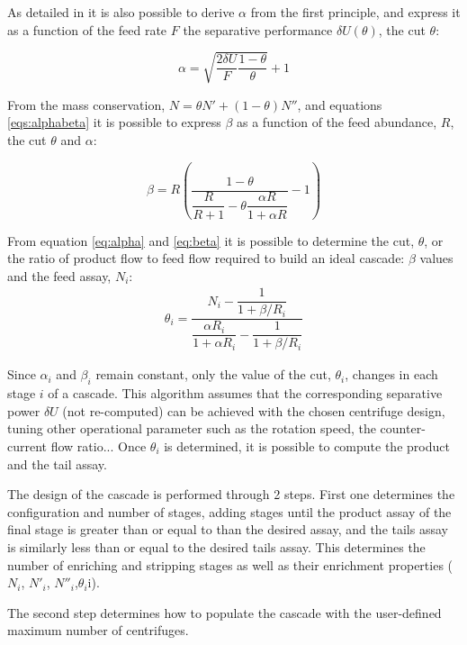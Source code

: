 As detailed in \cite{avery} it is also possible to derive $\alpha$ from the
first principle, and express it as a function of the feed rate $F$ the
separative performance $\delta U(\theta)$, the cut $\theta$:

    \begin{equation} \label{eq:alpha}
    \alpha = \sqrt{\frac{2\delta U}{F} \frac{1-\theta}{\theta}}+1
\end{equation}

From the mass conservation, $N = \theta N' + (1-\theta)N''$, and equations
\eqref{eqs:alphabeta} it is possible to express $\beta$ as a function of the
feed abundance, $R$, the cut $\theta$ and $\alpha$:

\begin{equation}\label{eq:beta}
    \beta =   R \left(\dfrac{1-\theta}
                     {\dfrac{R}{R+1}- \theta \dfrac{\alpha R}{1+\alpha R}} -1\right)
\end{equation}


From equation \eqref{eq:alpha} and \eqref{eq:beta} it is possible to determine
the cut, $\theta$, or the ratio of product flow to feed flow required to build an ideal
cascade:
$\beta$ values and the feed assay, $N_{i}$:
\begin{eqnarray}
    \theta_{i} = \dfrac{N_{i} - \dfrac{1}{1 + \beta/R_{i}}}{ \dfrac{\alpha R_{i}}{1 + \alpha R_{i}} -
           \dfrac{1}{1 + \beta/R_{i}}}
\end{eqnarray}

Since $\alpha_{i}$ and $\beta_{i}$ remain constant, only the value of the cut,
$\theta_{i}$, changes in each stage $i$ of a cascade.  This algorithm assumes
that the corresponding separative power $\delta U$ (not re-computed) can be
achieved with the chosen centrifuge design, tuning other operational parameter
such as the rotation speed, the counter-current flow ratio...  Once $\theta_{i}$
is determined, it is possible to compute the product and the tail assay.

The design of the cascade is performed through 2 steps.  First one determines the
configuration and number of stages, adding stages until the product assay of the
final stage is greater than or equal to than the desired assay, and the tails
assay is similarly less than or equal to the desired tails assay.  This
determines the number of enriching and stripping stages as well as their
enrichment properties ($N_{i}$, $N'_{i}$, $N''_{i}$,$\theta_{i}$i).


The second step determines how to populate the cascade with the user-defined
maximum number of centrifuges.  

